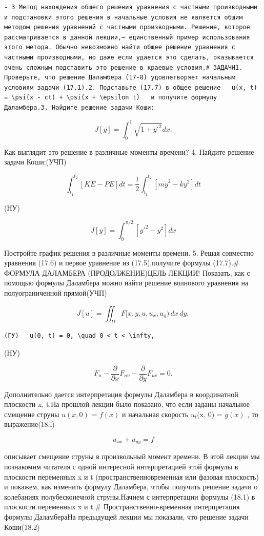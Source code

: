 \documentclass[
  ukrainian,
]{article}
\begin{document}
\begin{verbatim}
- 3 Метод нахождения общего решения уравнения с частными производными и подстановки этого решения в начальные условия не является общим методом решения уравнений с частными производными. Решение, которое рассматривается в данной лекции,— единственный пример использования этого метода. Обычно невозможно найти общее решение уравнения с частными производными, но даже если удается это сделать, оказывается очень сложным подставить это решение в краевые условия.# ЗАДАЧН1. Проверьте, что решение Даламбера (17-8) удовлетворяет начальным условиям задачи (17.1).2. Подставьте (17.7) в общее решение   u(x, t) = \psi(x - ct) + \psi(x + \epsilon t)   и получите формулу Даламбера.3. Найдите решение задачи Коши:
\end{verbatim}

\[
J[y] = \int_{0}^{1} \sqrt{1 + y'^{2}} dx.
\]

Как выглядит это решение в различные моменты времени? 4. Найдите решение
задачи Коши:(УЧП)

\[
\int_{t_{1}}^{t_{2}} [KE - PE] dt = \frac{1}{2} \int_{t_{1}}^{t_{2}} [m\dot{y}^{2} - ky^{2}] dt
\]

(НУ)

\[
J[y] = \int_{0}^{\pi/2} [y'^{2} - y^{2}] dx
\]

Постройте график решения в различные моменты времени. 5. Решая совместно
уравнения (17.6) и первое уравнение из (17.5),получите формулы (17.7).\#
ФОРМУЛА ДАЛАМБЕРА (ПРОДОЛЖЕНИЕ)ЦЕЛЬ ЛЕКЦИИ! Показать, как с помощью
формулы Даламбера можно найти решение волнового уравнения на
полуограниченной прямой(УЧП)

\[
J[u] = \iint_D F[x, y, u, u_x, u_y) \, dx \, dy,
\]

\begin{verbatim}
(ГУ)   u(0, t) = 0, \quad 0 < t < \infty,
\end{verbatim}

(НУ)

\[
F_{u} - \frac{\partial}{\partial x} F_{uv} - \frac{\partial}{\partial y} F_{uv} = 0.
\]

Дополнительно дается интерпретация формулы Даламбера в координатной
плоскости x, t.На прошлой лекции было показано, что если заданы
начальное смещение струны \(u(x, 0)\) = \(f(x)\) и начальная скорость
\(u_t\)(x, 0) = \(g(x)\) , то выражение(18.i)

\[
u_{xx} + u_{yy} = f
\]

описывает смещение струны в произвольный момент времени. В этой лекции
мы познакомим читателя с одной интересной интерпретацией этой формулы в
плоскости переменных x и t (пространственновременная или фазовая
плоскость) и покажем, как изменить формулу Даламбера, чтобы получить
решение задачи о колебаниях полубесконечной струны.Начнем с
интерпретации формулы (18.1) в плоскости переменных x и t.\#
Пространственно-временная интерпретация формулы ДаламбераНа предыдущей
лекции мы показали, что решение задачи Коши(18.2)
\end{document}
